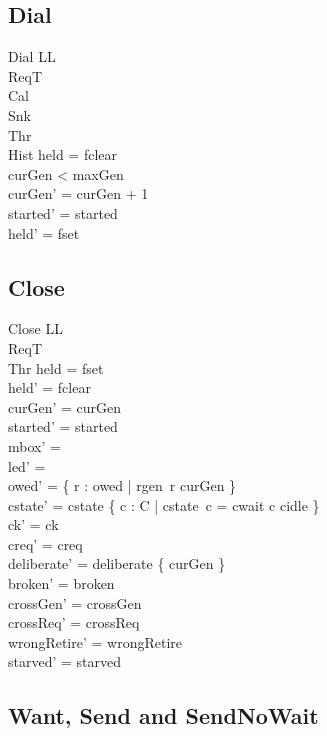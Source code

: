 \documentclass[a4paper,10pt,fleqn]{article}
\begin{document}
\subsection{Dial}

\begin{schema}{Dial}
  \Delta LL \\
  \Xi ReqT \\
  \Xi Cal \\
  \Xi Snk \\
  \Xi Thr \\
  \Xi Hist
\where
  held = fclear \\
  curGen < maxGen \\
  curGen' = curGen + 1 \\
  started' = started \\
  held' = fset
\end{schema}

\subsection{Close}

\begin{schema}{Close}
  \Delta LL \\
  \Xi ReqT \\
  \Xi Thr
\where
  held = fset \\
  held' = fclear \\
  curGen' = curGen \\
  started' = started \\
  mbox' = \emptyset \\
  led' = \emptyset \\
  owed' = \{ r : owed | rgen~r \neq curGen \} \\
  cstate' = cstate \oplus \{ c : C | cstate~c = cwait \spot c \mapsto cidle \} \\
  ck' = ck \\
  creq' = creq \\
  deliberate' = deliberate \cup \{ curGen \} \\
  broken' = broken \\
  crossGen' = crossGen \\
  crossReq' = crossReq \\
  wrongRetire' = wrongRetire \\
  starved' = starved
\end{schema}

\subsection{Want, Send and SendNoWait}
\end{document}
